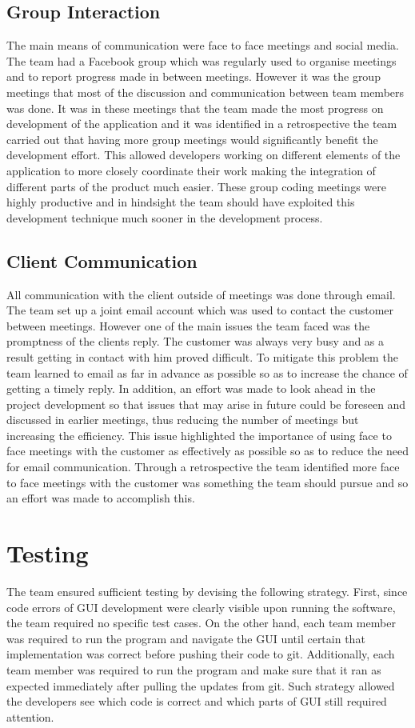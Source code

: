 \documentclass{l3proj}
\begin{document}
\subsection{Group Interaction}
The main means of communication were face to face meetings and social media. The team had a Facebook group which was regularly used to organise meetings and to report progress made in between meetings. However it was the group meetings that most of the discussion and communication between team members was done. It was in these meetings that the team made the most progress on development of the application and it was identified in a retrospective the team carried out that having more group meetings would significantly benefit the development effort. This allowed developers working on different elements of the application to more closely coordinate their work making the integration of different parts of the product much easier. These group coding meetings were highly productive and in hindsight the team should have exploited this development technique much sooner in the development process.

\subsection{Client Communication}
All communication with the client outside of meetings was done through email. The team set up a joint email account which was used to contact the customer between meetings. However one of the main issues the team faced was the promptness of the clients reply. The customer was always very busy and as a result getting in contact with him proved difficult. To mitigate this problem the team learned to email as far in advance as possible so as to increase the chance of getting a timely reply. In addition, an effort was made to look ahead in the project development so that issues that may arise in future could be foreseen and discussed in earlier meetings, thus reducing the number of meetings but increasing the efficiency. This issue highlighted the importance of using face to face meetings with the customer as effectively as possible so as to reduce the need for email communication. Through a retrospective the team identified more face to face meetings with the customer was something the team should pursue and so an effort was made to accomplish this.

\section{Testing}
\label{sec:testing}
The team ensured sufficient testing by devising the following strategy. First, since code errors of GUI development were clearly visible upon running the software, the team required no specific test cases. On the other hand, each team member was required to run the program and navigate the GUI until certain that implementation was correct before pushing their code to git. Additionally, each team member was required to run the program and make sure that it ran as expected immediately after pulling the updates from git. Such strategy allowed the developers see which code is correct and which parts of GUI still required attention.
\end{document}
